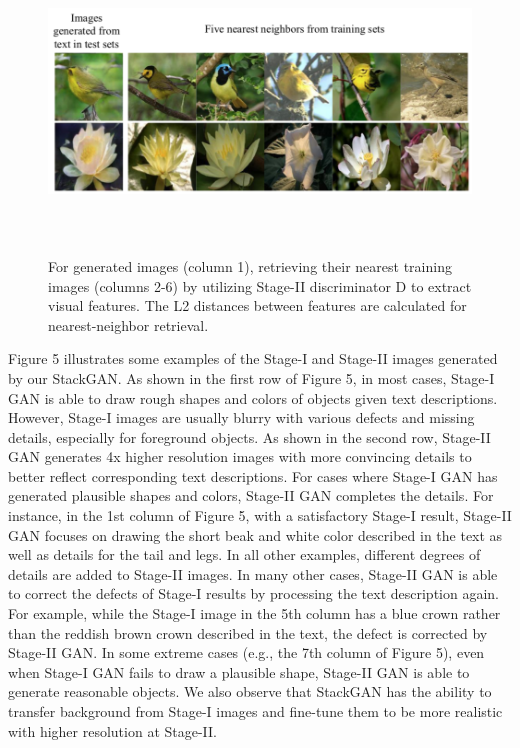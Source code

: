 \documentclass[a4paper,12pt,oneside]{article}
\begin{document}
\begin{figure}[H]
\centering
\includegraphics[height=8cm,width=15cm]{Figure6.png}
\caption[Utilizing Stage-II discriminator D to extract visual features]{For generated images (column 1), retrieving their nearest training images (columns 2-6) by utilizing Stage-II discriminator D to extract visual features. The L2 distances between features are calculated for nearest-neighbor retrieval.}
\end{figure}


Figure 5 illustrates some examples of the Stage-I and Stage-II images generated by our StackGAN. As shown in the first row of Figure 5, in most cases, Stage-I GAN is able to draw rough shapes and colors of objects 
given text descriptions. However, Stage-I images are usually blurry with various defects and missing details, especially for foreground objects. As shown in the second row, Stage-II GAN generates 4x higher resolution images with more convincing details to better
reflect corresponding text descriptions. For cases where Stage-I GAN has generated plausible shapes and colors, Stage-II GAN completes the details. For instance, in the 1st column of Figure 5, with a satisfactory Stage-I result, Stage-II GAN focuses on drawing 
the short beak and white color described in the text as well as details for the tail and legs. In all other examples, different degrees of details are added to Stage-II images. In many other cases, Stage-II GAN is able to correct the defects of Stage-I results by processing the text description again. For example, while the Stage-I image in the 5th column has a blue crown rather than the reddish brown crown described in the text, the defect is corrected by Stage-II GAN. In some extreme cases (e.g., the 7th column of Figure 5), even when Stage-I GAN fails to draw a plausible shape, Stage-II GAN is able to generate reasonable objects. We also observe that StackGAN has the ability to transfer background from Stage-I images and fine-tune them to be more realistic with higher resolution at Stage-II. 
\end{document}
